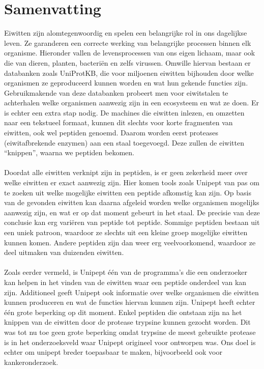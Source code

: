 \chapter*{Samenvatting}
Eiwitten zijn alomtegenwoordig en spelen een belangrijke rol in ons dagelijkse leven.
Ze garanderen een correcte werking van belangrijke processen binnen elk organisme.
Hieronder vallen de levensprocessen van ons eigen lichaam, maar ook die van dieren, planten, bacteriën en zelfs virussen.
Omwille hiervan bestaan er databanken zoals UniProtKB, die voor miljoenen eiwitten bijhouden door welke organismen ze geproduceerd kunnen worden en wat hun gekende functies zijn.
Gebruikmakende van deze databanken probeert men voor eiwitstalen te achterhalen welke organismen aanwezig zijn in een ecosysteem en wat ze doen.
Er is echter een extra stap nodig.
De machines die eiwitten inlezen, en omzetten naar een tekstueel formaat, kunnen dit slechts voor korte fragmenten van eiwitten, ook wel peptiden genoemd.
Daarom worden eerst proteases (eiwitafbrekende enzymen) aan een staal toegevoegd.
Deze zullen de eiwitten ``knippen'', waarna we peptiden bekomen.
\\ \\
Doordat alle eiwitten verknipt zijn in peptiden, is er geen zekerheid meer over welke eiwitten er exact aanwezig zijn.
Hier komen tools zoals Unipept van pas om te zoeken uit welke mogelijke eiwitten een peptide afkomstig kan zijn.
Op basis van de gevonden eiwitten kan daarna afgeleid worden welke organismen mogelijks aanwezig zijn, en wat er op dat moment gebeurt in het staal.
De precisie van deze conclusie kan erg variëren van peptide tot peptide.
Sommige peptiden bestaan uit een uniek patroon, waardoor ze slechts uit een kleine groep mogelijke eiwitten kunnen komen.
Andere peptiden zijn dan weer erg veelvoorkomend, waardoor ze deel uitmaken van duizenden eiwitten.
\\ \\
Zoals eerder vermeld, is Unipept één van de programma's die een onderzoeker kan helpen in het vinden van de eiwitten waar een peptide onderdeel van kan zijn.
Additioneel geeft Unipept ook informatie over welke organismen die eiwitten kunnen produceren en wat de functies hiervan kunnen zijn.
Unipept heeft echter één grote beperking op dit moment.
Enkel peptiden die ontstaan zijn na het knippen van de eiwitten door de protease trypsine kunnen gezocht worden.
Dit was tot nu toe geen grote beperking omdat trypsine de meest gebruikte protease is in het onderzoeksveld waar Unipept origineel voor ontworpen was.
Ons doel is echter om unipept breder toepasbaar te maken, bijvoorbeeld ook voor kankeronderzoek.
